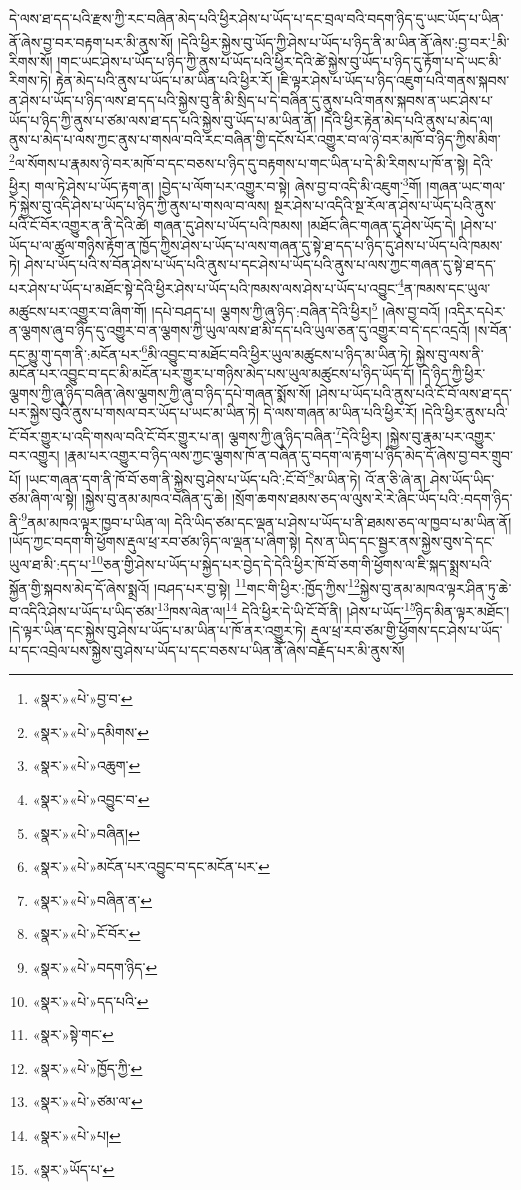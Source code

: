 དེ་ལས་ཐ་དད་པའི་རྫས་ཀྱི་རང་བཞིན་མེད་པའི་ཕྱིར་ཤེས་པ་ཡོད་པ་དང་བྲལ་བའི་བདག་ཉིད་དུ་ཡང་ཡོད་པ་ཡིན་ནོ་ཞེས་བྱ་བར་བརྟག་པར་མི་ནུས་སོ། །དེའི་ཕྱིར་སྐྱེས་བུ་ཡོད་ཀྱི་ཤེས་པ་ཡོད་པ་ཉིད་ནི་མ་ཡིན་ནོ་ཞེས་:བྱ་བར་\footnote{«སྣར་»«པེ་»བྱ་བ་}མི་རིགས་སོ། །གང་ཡང་ཤེས་པ་ཡོད་པ་ཉིད་ཀྱི་ནུས་པ་ཡོད་པའི་ཕྱིར་དེའི་ཚེ་སྐྱེས་བུ་ཡོད་པ་ཉིད་དུ་རྟོག་པ་དེ་ཡང་མི་རིགས་ཏེ། རྟེན་མེད་པའི་ནུས་པ་ཡོད་པ་མ་ཡིན་པའི་ཕྱིར་རོ། །ཇི་ལྟར་ཤེས་པ་ཡོད་པ་ཉིད་འཇུག་པའི་གནས་སྐབས་ན་ཤེས་པ་ཡོད་པ་ཉིད་ལས་ཐ་དད་པའི་སྐྱེས་བུ་ནི་མི་སྲིད་པ་དེ་བཞིན་དུ་ནུས་པའི་གནས་སྐབས་ན་ཡང་ཤེས་པ་ཡོད་པ་ཉིད་ཀྱི་ནུས་པ་ཙམ་ལས་ཐ་དད་པའི་སྐྱེས་བུ་ཡོད་པ་མ་ཡིན་ནོ། །དེའི་ཕྱིར་རྟེན་མེད་པའི་ནུས་པ་མེད་ལ། ནུས་པ་མེད་པ་ལས་ཀྱང་ནུས་པ་གསལ་བའི་རང་བཞིན་གྱི་དངོས་པོར་འགྱུར་བ་ལ་ཉེ་བར་མཁོ་བ་ཉིད་ཀྱིས་མིག་\footnote{«སྣར་»«པེ་»དམིགས་}ལ་སོགས་པ་རྣམས་ཉེ་བར་མཁོ་བ་དང་བཅས་པ་ཉིད་དུ་བརྟགས་པ་གང་ཡིན་པ་དེ་མི་རིགས་པ་ཁོ་ན་སྟེ། དེའི་ཕྱིར། གལ་ཏེ་ཤེས་པ་ཡོད་རྟག་ན། །བྱེད་པ་ལོག་པར་འགྱུར་བ་སྟེ། ཞེས་བྱ་བ་འདི་མི་འཇུག་\footnote{«སྣར་»«པེ་»འཆུག་}གོ། །གཞན་ཡང་གལ་ཏེ་སྐྱེས་བུ་འདི་ཤེས་པ་ཡོད་པ་ཉིད་ཀྱི་ནུས་པ་གསལ་བ་ལས། སྔར་ཤེས་པ་འདིའི་སྔ་རོལ་ན་ཤེས་པ་ཡོད་པའི་ནུས་པའི་ངོ་བོར་འགྱུར་ན་ནི་དེའི་ཚེ། གཞན་དུ་ཤེས་པ་ཡོད་པའི་ཁམས། །མཐོང་ཞིང་གཞན་དུ་ཤེས་ཡོད་དེ། །ཤེས་པ་ཡོད་པ་ལ་ཚུལ་གཉིས་རྟོག་ན་ཁྱོད་ཀྱིས་ཤེས་པ་ཡོད་པ་ལས་གཞན་དུ་སྟེ་ཐ་དད་པ་ཉིད་དུ་ཤེས་པ་ཡོད་པའི་ཁམས་ཏེ། ཤེས་པ་ཡོད་པའི་ས་བོན་ཤེས་པ་ཡོད་པའི་ནུས་པ་དང་ཤེས་པ་ཡོད་པའི་ནུས་པ་ལས་ཀྱང་གཞན་དུ་སྟེ་ཐ་དད་པར་ཤེས་པ་ཡོད་པ་མཐོང་སྟེ་དེའི་ཕྱིར་ཤེས་པ་ཡོད་པའི་ཁམས་ལས་ཤེས་པ་ཡོད་པ་འབྱུང་\footnote{«སྣར་»«པེ་»འབྱུང་བ་}ན་ཁམས་དང་ཡུལ་མཚུངས་པར་འགྱུར་བ་ཞིག་གོ། །དཔེ་བཤད་པ། ལྕགས་ཀྱི་ཞུ་ཉིད་:བཞིན་དེའི་ཕྱིར།\footnote{«སྣར་»«པེ་»བཞིན།} །ཞེས་བྱ་བའོ། །འདིར་དཔེར་ན་ལྕགས་ཞུ་བ་ཉིད་དུ་འགྱུར་བ་ན་ལྕགས་ཀྱི་ཡུལ་ལས་ཐ་མི་དད་པའི་ཡུལ་ཅན་དུ་འགྱུར་བ་དེ་དང་འདྲའོ། །ས་བོན་དང་མྱུ་གུ་དག་ནི་:མངོན་པར་\footnote{«སྣར་»«པེ་»མངོན་པར་འབྱུང་བ་དང་མངོན་པར་}མི་འབྱུང་བ་མཐོང་བའི་ཕྱིར་ཡུལ་མཚུངས་པ་ཉིད་མ་ཡིན་ཏེ། སྐྱེས་བུ་ལས་ནི་མངོན་པར་འབྱུང་བ་དང་མི་མངོན་པར་གྱུར་པ་གཉིས་མེད་པས་ཡུལ་མཚུངས་པ་ཉིད་ཡོད་དོ། །དེ་ཉིད་ཀྱི་ཕྱིར་ལྕགས་ཀྱི་ཞུ་ཉིད་བཞིན་ཞེས་ལྕགས་ཀྱི་ཞུ་བ་ཉིད་དཔེ་གཞན་སྨོས་སོ། །ཤེས་པ་ཡོད་པའི་ནུས་པའི་ངོ་བོ་ལས་ཐ་དད་པར་སྐྱེས་བུའི་ནུས་པ་གསལ་བར་ཡོད་པ་ཡང་མ་ཡིན་ཏེ། དེ་ལས་གཞན་མ་ཡིན་པའི་ཕྱིར་རོ། །དེའི་ཕྱིར་ནུས་པའི་ངོ་བོར་གྱུར་པ་འདི་གསལ་བའི་ངོ་བོར་གྱུར་པ་ན། ལྕགས་ཀྱི་ཞུ་ཉིད་བཞིན་\footnote{«སྣར་»«པེ་»བཞིན་ན་}དེའི་ཕྱིར། །སྐྱེས་བུ་རྣམ་པར་འགྱུར་བར་འགྱུར། །རྣམ་པར་འགྱུར་བ་ཉིད་ལས་ཀྱང་ལྕགས་ཁོ་ན་བཞིན་དུ་བདག་ལ་རྟག་པ་ཉིད་མེད་དོ་ཞེས་བྱ་བར་གྲུབ་པོ། །ཡང་གཞན་དག་ནི་ཁོ་བོ་ཅག་ནི་སྐྱེས་བུ་ཤེས་པ་ཡོད་པའི་:ངོ་བོ་\footnote{«སྣར་»«པེ་»ངོ་བོར་}མ་ཡིན་ཏེ། འོ་ན་ཅི་ཞེ་ན། ཤེས་ཡོད་ཡིད་ཙམ་ཞིག་ལ་སྟེ། །སྐྱེས་བུ་ནམ་མཁའ་བཞིན་དུ་ཆེ། །སྲོག་ཆགས་ཐམས་ཅད་ལ་ལུས་རེ་རེ་ཞིང་ཡོད་པའི་:བདག་ཉིད་ནི་\footnote{«སྣར་»«པེ་»བདག་ཉིད་}ནམ་མཁའ་ལྟར་ཁྱབ་པ་ཡིན་ལ། དེའི་ཡིད་ཙམ་དང་ལྡན་པ་ཤེས་པ་ཡོད་པ་ནི་ཐམས་ཅད་ལ་ཁྱབ་པ་མ་ཡིན་ནོ། །ཡོད་ཀྱང་བདག་གི་ཕྱོགས་རྡུལ་ཕྲ་རབ་ཙམ་ཉིད་ལ་ལྡན་པ་ཞིག་སྟེ། དེས་ན་ཡིད་དང་སྦྱར་ནས་སྐྱེས་བུས་དེ་དང་ཡུལ་ཐ་མི་:དད་པ་\footnote{«སྣར་»«པེ་»དད་པའི་}ཅན་གྱི་ཤེས་པ་ཡོད་པ་སྐྱེད་པར་བྱེད་དེ་དེའི་ཕྱིར་ཁོ་བོ་ཅག་གི་ཕྱོགས་ལ་ཇི་སྐད་སྨྲས་པའི་སྐྱོན་གྱི་སྐབས་མེད་དོ་ཞེས་སྨྲའོ། །བཤད་པར་བྱ་སྟེ། \footnote{«སྣར་»སྟེ་གང་}གང་གི་ཕྱིར་:ཁྱོད་ཀྱིས་\footnote{«སྣར་»«པེ་»ཁྱོད་ཀྱི་}སྐྱེས་བུ་ནམ་མཁའ་ལྟར་ཤིན་ཏུ་ཆེ་བ་འདིའི་ཤེས་པ་ཡོད་པ་ཡིད་ཙམ་\footnote{«སྣར་»«པེ་»ཙམ་ལ་}ཁས་ལེན་ལ།\footnote{«སྣར་»«པེ་»པ།} དེའི་ཕྱིར་དེ་ཡི་ངོ་བོ་ནི། །ཤེས་པ་ཡོད་\footnote{«སྣར་»ཡོད་པ་}ཉིད་མིན་ལྟར་མཐོང་། །དེ་ལྟར་ཡིན་དང་སྐྱེས་བུ་ཤེས་པ་ཡོད་པ་མ་ཡིན་པ་ཁོ་ནར་འགྱུར་ཏེ། རྡུལ་ཕྲ་རབ་ཙམ་གྱི་ཕྱོགས་དང་ཤེས་པ་ཡོད་པ་དང་འབྲེལ་པས་སྐྱེས་བུ་ཤེས་པ་ཡོད་པ་དང་བཅས་པ་ཡིན་ནོ་ཞེས་བརྗོད་པར་མི་ནུས་སོ། 